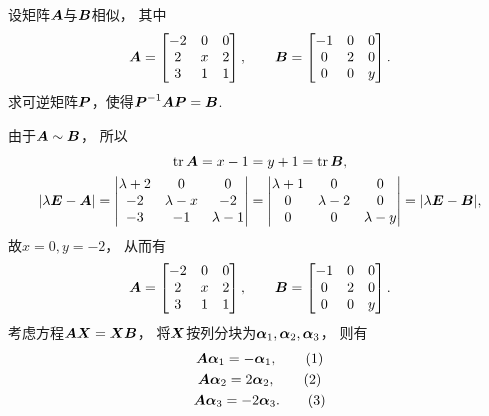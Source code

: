 \begin{example}
设矩阵\(\boldsymbol{A}\)与\(\boldsymbol{B}\)相似，
其中\begin{equation*}
	\boldsymbol{A} = \begin{bmatrix}
		-2 & 0 & 0 \\
		2 & x & 2 \\
		3 & 1 & 1
	\end{bmatrix},
	\qquad
	\boldsymbol{B} = \begin{bmatrix}
		-1 & 0 & 0 \\
		0 & 2 & 0 \\
		0 & 0 & y
	\end{bmatrix}.
\end{equation*}
求可逆矩阵\(\boldsymbol{P}\)，使得\(\boldsymbol{P}^{-1} \boldsymbol{A} \boldsymbol{P} = \boldsymbol{B}\).
\begin{solution}
由于\(\boldsymbol{A} \sim \boldsymbol{B}\)，
所以\begin{gather*}
	\tr\boldsymbol{A} = x - 1 = y + 1 = \tr\boldsymbol{B}, \\
	\abs{\lambda\boldsymbol{E}-\boldsymbol{A}}
	= \begin{vmatrix}
		\lambda+2 & 0 & 0 \\
		-2 & \lambda-x & -2 \\
		-3 & -1 & \lambda-1
	\end{vmatrix}
	= \begin{vmatrix}
		\lambda+1 & 0 & 0 \\
		0 & \lambda-2 & 0 \\
		0 & 0 & \lambda-y
	\end{vmatrix}
	= \abs{\lambda\boldsymbol{E}-\boldsymbol{B}},
\end{gather*}
故\(x = 0,
y = -2\)，
从而有\begin{equation*}
	\boldsymbol{A} = \begin{bmatrix}
		-2 & 0 & 0 \\
		2 & x & 2 \\
		3 & 1 & 1
	\end{bmatrix},
	\qquad
	\boldsymbol{B} = \begin{bmatrix}
		-1 & 0 & 0 \\
		0 & 2 & 0 \\
		0 & 0 & y
	\end{bmatrix}.
\end{equation*}
考虑方程\(\boldsymbol{A} \boldsymbol{X} = \boldsymbol{X} \boldsymbol{B}\)，
将\(\boldsymbol{X}\)按列分块为\(\boldsymbol\alpha_1,\boldsymbol\alpha_2,\boldsymbol\alpha_3\)，
则有\begin{gather*}
	\vb{A} \vb\alpha_1 = -\vb\alpha_1, \tag1 \\
	\vb{A} \vb\alpha_2 = 2\vb\alpha_2, \tag2 \\
	\vb{A} \vb\alpha_3 = -2\vb\alpha_3. \tag3
\end{gather*}


\end{solution}
\end{example}
